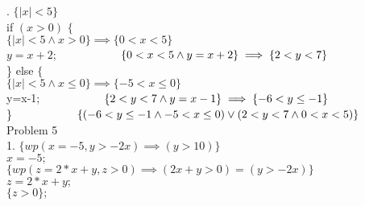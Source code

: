 \documentclass[12pt]{article}
\begin{document}
	. $\{ |x|<5\}$\\
	\hspace*{1cm} if $(x>0)$ $\{$\\
	\hspace*{1cm}\hspace*{1cm} $\{|x|<5 \land x>0\} \implies \{0<x<5\}$\\
	\hspace*{3.5cm} $y=x+2$;$\\
	\hspace*{1cm}\hspace*{1cm} \{0<x<5 \land y = x+2\} \implies \{2<y<7\}$\\
	\hspace*{1cm} \} else $\{$\\
	\hspace*{1cm}\hspace*{1cm} $\{|x|<5 \land x \leq 0\} \implies \{-5< x \le 0\}$\\
	\hspace*{2.5cm}\hspace*{1cm} y=x-1;$\\
	\hspace*{1cm}\hspace*{1cm} \{2<y<7 \land y=x-1\} \implies \{-6<y\le-1\}$\\
	\hspace*{1cm} \}$\\
	\hspace*{1cm}\hspace*{1cm} \{(-6<y\le-1 \land -5 <x\leq 0) \lor (2<y<7 \land 0<x<5)\}$\\
	
	\newpage
	\noindent Problem 5\\
	
	1. $\{wp(x=-5,y>-2x) \implies (y>10) \}$\\
	\hspace*{2.5cm} $x=-5;$\\
	\hspace*{2.5cm}\qquad $\{wp(z=2*x+y,z>0) \implies (2x+y>0) = (y>-2x)\}$\\
	\hspace*{2.5cm} $z=2*x+y;$\\
	\hspace*{2.5cm}\qquad $\{z>0\};$\\
\end{document}
